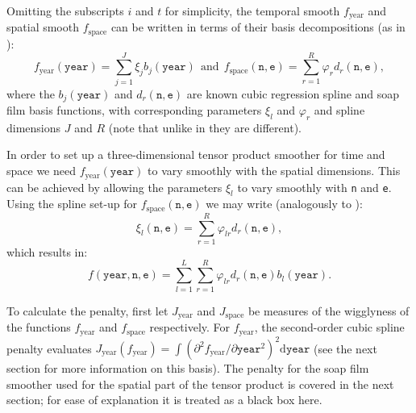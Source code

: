 Omitting the subscripts $i$ and $t$ for simplicity, the temporal smooth $f_\text{year}$ and spatial smooth $f_\text{space}$ can be written in terms of their basis decompositions (as in ):
\begin{equation*}
f_\text{year}(\texttt{year})=\sum_{j=1}^J \xi_j b_j(\texttt{year}) \ \ \text{and} \ \ f_\text{space}(\texttt{n},\texttt{e})=\sum_{r=1}^R \varphi_r d_r(\texttt{n},\texttt{e}),
\end{equation*}
where the $b_j(\texttt{year})$ and $d_r(\texttt{n},\texttt{e})$ are known cubic regression spline and soap film basis functions, with corresponding parameters $\xi_l$ and $\varphi_r$ and spline dimensions $J$ and $R$ (note that unlike in  they are different). 

In order to set up a three-dimensional tensor product smoother for time and space we need $f_\text{year}(\texttt{year})$ to vary smoothly with the spatial dimensions. This can be achieved by allowing the parameters $\xi_l$ to vary smoothly with \texttt{n} and \texttt{e}. Using the spline set-up for $f_\text{space}(\texttt{n},\texttt{e})$ we may write (analogously to ):
$$
\xi_l(\texttt{n},\texttt{e})=\sum_{r=1}^R \varphi_{lr} d_r(\texttt{n},\texttt{e}),
$$    
which results in:
$$
f(\texttt{year},\texttt{n},\texttt{e})=\sum_{l=1}^L \sum_{r=1}^R \varphi_{lr} d_r(\texttt{n},\texttt{e}) b_l(\texttt{year}). 
$$

To calculate the penalty, first let $J_\text{year}$ and $J_\text{space}$ be measures of the wigglyness of the functions $f_\text{year}$ and $f_\text{space}$ respectively. For $f_\text{year}$, the second-order cubic spline penalty evaluates $J_\text{year}(f_\text{year})=\int\left( \partial^2 f_\text{year}/\partial \texttt{year}^2 \right)^2 \text{d}\texttt{year}$ (see the next section for more information on this basis). The penalty for the soap film smoother used for the spatial part of the tensor product is covered in the next section; for ease of explanation it is treated as a black box here.

